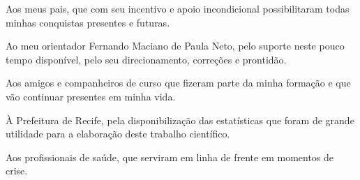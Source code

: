 \begin{agradecimentos}
Aos meus pais, que com seu incentivo e apoio incondicional possibilitaram todas minhas conquistas presentes e futuras.

Ao meu orientador Fernando Maciano de Paula Neto, pelo suporte neste pouco tempo disponível, pelo seu direcionamento, correções e prontidão.

Aos amigos e companheiros de curso que fizeram parte da minha formação e que vão continuar presentes em minha vida.

À Prefeitura de Recife, pela disponibilização das estatísticas que foram de grande utilidade para a elaboração deste trabalho científico.

Aos profissionais de saúde, que serviram em linha de frente em momentos de crise.


\end{agradecimentos}